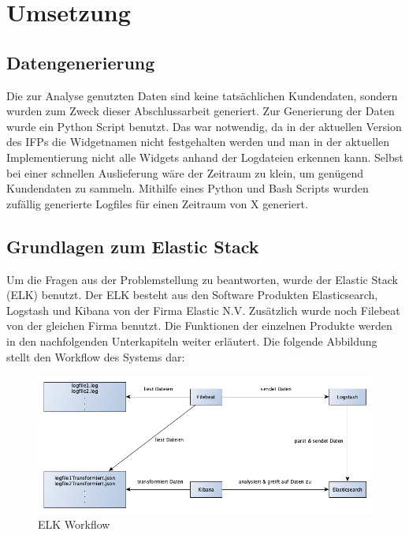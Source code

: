 \section{Umsetzung}
\label{sec:Umsetzung}

\subsection{Datengenerierung}
\label{sub:Datengenerierung}

Die zur Analyse genutzten Daten sind keine tatsächlichen Kundendaten, sondern wurden zum Zweck dieser Abschlussarbeit generiert.
Zur Generierung der Daten wurde ein Python Script benutzt. Das war notwendig, da in der aktuellen Version des IFPs die Widgetnamen nicht festgehalten werden und man in der aktuellen Implementierung nicht alle Widgets anhand der Logdateien erkennen kann. Selbst bei einer schnellen Auslieferung wäre der Zeitraum zu klein, um genügend Kundendaten zu sammeln. Mithilfe eines Python und Bash Scripts wurden zufällig generierte Logfiles für einen Zeitraum von X generiert. 

\subsection{Grundlagen zum Elastic Stack}
\label{sub:Grundlagen zum Elastic Stack}
Um die Fragen aus der Problemstellung zu beantworten, wurde der Elastic Stack (ELK) benutzt. Der ELK besteht aus den Software Produkten Elasticsearch, Logstash und Kibana von der Firma Elastic N.V. Zusätzlich wurde noch Filebeat von der gleichen Firma benutzt. Die Funktionen der einzelnen Produkte werden in den nachfolgenden Unterkapiteln weiter erläutert. Die folgende Abbildung stellt den Workflow des Systems dar:

\begin{figure}[htb]
\begin{center}
	\includegraphics[width=440pt]{bilder/workflow.png}
\end{center}
\caption{ELK Workflow}
\label{fig:elk_workflow}
\end{figure}


